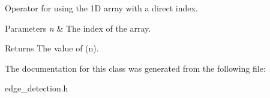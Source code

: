 Operator for using the 1D array with a direct index.


\begin{DoxyParams}{Parameters}
{\em n} & The index of the array.\\
\hline
\end{DoxyParams}
\begin{DoxyReturn}{Returns}
The value of (n). 
\end{DoxyReturn}


The documentation for this class was generated from the following file\+:\begin{DoxyCompactItemize}
\item 
edge\+\_\+detection.\+h\end{DoxyCompactItemize}
